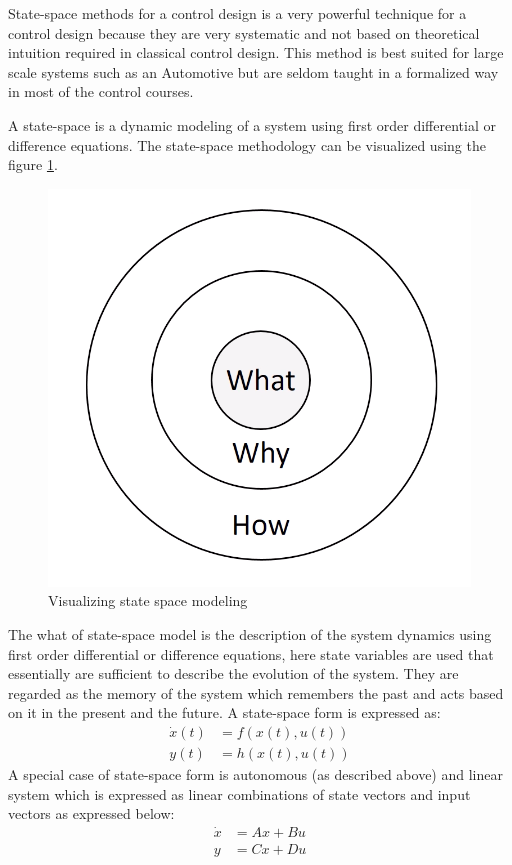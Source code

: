 State-space methods for a control design is a very powerful technique for a control design because they are very systematic and not based on theoretical intuition required in classical control design. This method is best suited for large scale systems such as an Automotive but are seldom taught in a formalized way in most of the control courses. 

A state-space is a dynamic modeling of a system using first order differential or difference equations. The state-space methodology can be visualized using the figure \ref{Fig_StateSpaceMethodology}.
\begin{figure}[h!]
	\centering
	\includegraphics[width=0.7\linewidth]{Bilder/StateSpaceMethodology}
	\caption{Visualizing state space modeling}
	\label{Fig_StateSpaceMethodology}
\end{figure}

The what of state-space model is the description of the system dynamics using first order differential or difference equations, here state variables are used that essentially are sufficient to describe the evolution of the system. They are regarded as the memory of the system which remembers the past and acts based on it in the present and the future. A state-space form is expressed as:
\begin{align}
	\dot{x}(t) &= f(x(t),u(t)) \\
	y(t) &= h(x(t),u(t))
\end{align}
A special case of state-space form is autonomous (as described above) and linear system which is expressed as linear combinations of state vectors and input vectors as expressed below:
\begin{align}
	\dot{x} &= A x + B u \\
	y &= Cx + Du
\end{align}

